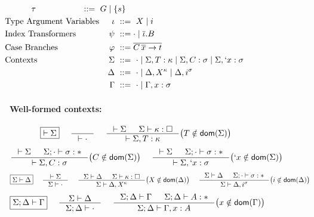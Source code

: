 \begin{figure}
\begin{align*}
	& \tau		&~ ::= ~ G \mid \{s\}
 \!\!\!\! \!\!\!\! \\
&\!\!\!\!\!\!\!\!\!\!\!\!\!\!\!\!\!\!\!
 \text{Type Argument Variables}
 \!\!\!\!\!\!\!\!\!\!\!\!\!\!\!\!\!\!\!
	& \iota		&~ ::= ~ X \mid i
 \!\!\!\! \!\!\!\! \\
&\!\!\!\!\!\!\!\!\!\!\!\!\!\!\!\!\!\!\!
 \text{Index Transformers}
 \!\!\!\!\!\!\!\!\!\!\!\!\!\!\!\!\!\!\!
	& \psi		&~ ::= \cdot \mid \overline\iota . B
 \!\!\!\! \!\!\!\! \\
&\!\!\!\!\!\!\!\!\!\!\!\!\!\!\!\!\!\!\!
 \text{Case Branches}
 \!\!\!\!\!\!\!\!\!\!\!\!\!\!\!\!\!\!\!
	& \varphi	&~ ::= \overline{C\,\overline{x} -> t}
 \!\!\!\! \!\!\!\! \\
&\!\!\!\!\!\!\!\!\!\!\!\!\!\!\!\!\!\!\!
 \text{Contexts}
 \!\!\!\!\!\!\!\!\!\!\!\!\!\!\!\!\!\!\!
	& \Sigma	&~ ::= ~ \cdot
			   \mid \Sigma, T: \kappa
			   \mid \Sigma, C: \sigma
			   \mid \Sigma, `x: \sigma
 \!\!\!\! \!\!\!\! \\
&\!\!\!\!\!\!\!\!\!\!\!\!\!\!\!\!\!\!\!
 \!\!\!\!\!\!\!\!\!\!\!\!\!\!\!\!\!\!\!
	& \Delta	&~ ::= ~ \cdot
			   \mid \Delta, X^\kappa
			   \mid \Delta, i^\sigma
 \!\!\!\! \!\!\!\! \\
&\!\!\!\!\!\!\!\!\!\!\!\!\!\!\!\!\!\!\!
 \!\!\!\!\!\!\!\!\!\!\!\!\!\!\!\!\!\!\!
	& \Gamma	&~ ::= ~ \cdot \mid \Gamma,x:\sigma
 \!\!\!\! \!\!\!\!
\end{align*}

\paragraph{Well-formed contexts:}
\[ \fbox{$|- \Sigma$}
 ~~~~
   \inference{}{|- \cdot}
 ~~~~
   \inference{|- \Sigma & \Sigma |- \kappa:\square}
             {|- \Sigma,T:\kappa}
      \big( T\notin\dom(\Sigma) \big)
\]
\[ \inference{|- \Sigma & \Sigma;\cdot |- \sigma:*}
             {|- \Sigma,C:\sigma}
      \big( C\notin\dom(\Sigma) \big)
 ~~~~
   \inference{|- \Sigma & \Sigma;\cdot |- \sigma:*}
             {|- \Sigma,`x:\sigma}
      \big( `x\notin\dom(\Sigma) \big)
\]
\[ \fbox{$\Sigma|- \Delta$}
 ~~~~
   \inference{|- \Sigma}{\Sigma |- \cdot}
 ~~~~
   \inference{\Sigma |- \Delta & \Sigma |- \kappa:\square}
             {\Sigma |- \Delta,X^\kappa}
      \big( X\notin\dom(\Delta) \big)
 ~~~~ 
   \inference{\Sigma |- \Delta & \Sigma;\cdot |- \sigma:*}
             {\Sigma |- \Delta,i^\sigma}
      \big( i\notin\dom(\Delta) \big)
\]
\[ \fbox{$\Sigma;\Delta |- \Gamma$}
 ~~~~
   \inference{\Sigma |- \Delta}{\Sigma;\Delta |- \cdot}
 ~~~~
   \inference{\Sigma;\Delta |- \Gamma & \Sigma;\Delta |- A:*}
             {\Sigma;\Delta |- \Gamma,x:A}
      \big( x\notin\dom(\Gamma) \big)
\]
~\\


\end{figure}
